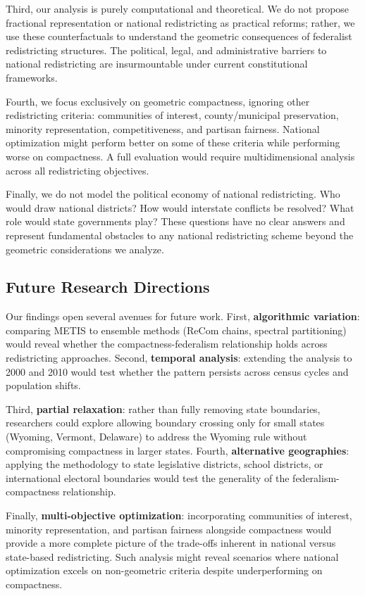 Third, our analysis is purely computational and theoretical. We do not propose fractional representation or national redistricting as practical reforms; rather, we use these counterfactuals to understand the geometric consequences of federalist redistricting structures. The political, legal, and administrative barriers to national redistricting are insurmountable under current constitutional frameworks.

Fourth, we focus exclusively on geometric compactness, ignoring other redistricting criteria: communities of interest, county/municipal preservation, minority representation, competitiveness, and partisan fairness. National optimization might perform better on some of these criteria while performing worse on compactness. A full evaluation would require multidimensional analysis across all redistricting objectives.

Finally, we do not model the political economy of national redistricting. Who would draw national districts? How would interstate conflicts be resolved? What role would state governments play? These questions have no clear answers and represent fundamental obstacles to any national redistricting scheme beyond the geometric considerations we analyze.

\subsection{Future Research Directions}

Our findings open several avenues for future work. First, \textbf{algorithmic variation}: comparing METIS to ensemble methods (ReCom chains, spectral partitioning) would reveal whether the compactness-federalism relationship holds across redistricting approaches. Second, \textbf{temporal analysis}: extending the analysis to 2000 and 2010 would test whether the pattern persists across census cycles and population shifts.

Third, \textbf{partial relaxation}: rather than fully removing state boundaries, researchers could explore allowing boundary crossing only for small states (Wyoming, Vermont, Delaware) to address the Wyoming rule without compromising compactness in larger states. Fourth, \textbf{alternative geographies}: applying the methodology to state legislative districts, school districts, or international electoral boundaries would test the generality of the federalism-compactness relationship.

Finally, \textbf{multi-objective optimization}: incorporating communities of interest, minority representation, and partisan fairness alongside compactness would provide a more complete picture of the trade-offs inherent in national versus state-based redistricting. Such analysis might reveal scenarios where national optimization excels on non-geometric criteria despite underperforming on compactness.
